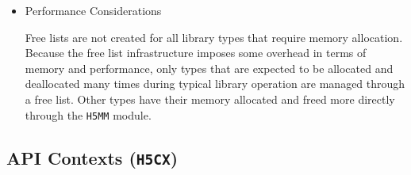 \begin{itemize}
\item Performance Considerations

Free lists are not created for all library types that require memory allocation. Because the free list infrastructure imposes some overhead in terms of memory and performance, only types that are expected to be allocated and deallocated many times during typical library operation are managed through a free list. Other types have their memory allocated and freed more directly through the \texttt{H5MM} module.

\end{itemize}

\subsection{API Contexts (\texttt{H5CX})}


